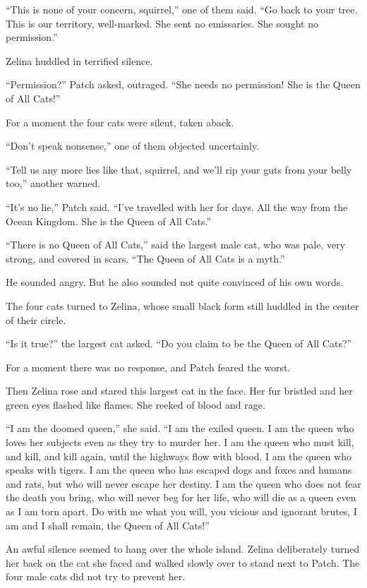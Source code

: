 \documentclass[ebook,oneside,openany,17pt]{memoir}
\newenvironment{tolerant}[1]{%
  \par\tolerance=#1\relax
}{%
  \par
}
\begin{document}
\begin{tolerant}{1000}
“This is none of your concern, squirrel,” one of them said. “Go back
to your tree. This is our territory, well-marked. She sent no
emissaries. She sought no permission.”
\end{tolerant}

Zelina huddled in terrified silence.

“Permission?” Patch asked, outraged. “She needs no permission! She is
the Queen of All Cats!”

For a moment the four cats were silent, taken aback.

“Don’t speak nonsense,” one of them objected uncertainly.

“Tell us any more lies like that, squirrel, and we’ll rip your guts
from your belly too,” another warned.

“It’s no lie,” Patch said. “I’ve travelled with her for days. All the
way from the Ocean Kingdom. She is the Queen of All Cats.”

“There is no Queen of All Cats,” said the largest male cat, who was
pale, very strong, and covered in scars. “The Queen of All Cats is a
myth.”

He sounded angry. But he also sounded not quite convinced of his own
words.

The four cats turned to Zelina, whose small black form still huddled
in the center of their circle.

“Is it true?” the largest cat asked. “Do you claim to be the Queen of
All Cats?”

For a moment there was no response, and Patch feared the worst.

Then Zelina rose and stared this largest cat in the face. Her fur
bristled and her green eyes flashed like flames. She reeked of blood
and rage.

“I am the doomed queen,” she said. “I am the exiled queen. I am the
queen who loves her subjects even as they try to murder her. I am the
queen who must kill, and kill, and kill again, until the highways flow
with blood. I am the queen who speaks with tigers. I am the queen who
has escaped dogs and foxes and humans and rats, but who will never
escape her destiny. I am the queen who does not fear the death you
bring, who will never beg for her life, who will die as a queen even
as I am torn apart. Do with me what you will, you vicious and ignorant
brutes, I am and I shall remain, the Queen of All Cats!”

An awful silence seemed to hang over the whole island. Zelina
deliberately turned her back on the cat she faced and walked slowly
over to stand next to Patch. The four male cats did not try to prevent
her.
\end{document}
